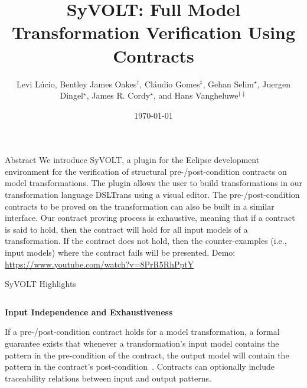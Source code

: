 \documentclass[final,hyperref={pdfpagelabels=false}]{beamer}
\title{SyVOLT: Full Model Transformation Verification Using Contracts}
\author{Levi L\'{u}cio, Bentley James Oakes$^{\dagger}$, Cl\'{a}udio Gomes$^{\ddagger}$, Gehan Selim$^{\star}$,
  Juergen Dingel$^{\star}$,
  James R. Cordy$^{\star}$, and
  Hans Vangheluwe$^{\dagger\ddagger}$
  }
\institute[McGill, Antwerp, Queen's]{$^{\dagger}$McGill University, Montreal, Canada\qquad
       $^{\ddagger}$University of Antwerp, Belgium
       $^{\star}$Queen's University, Kingston, Canada}
\date{\today}
\begin{document}
  \begin{frame}{}
      \vspace{-2.7cm}
        \begin{block}{\normalsize Abstract}
        \footnotesize
   		We introduce SyVOLT, a plugin for the Eclipse
   		development environment for the verification of structural pre-/post-condition contracts on model transformations. The plugin
   		allows the user to build transformations in our transformation
   		language DSLTrans using a visual editor. The pre-/post-condition
   		contracts to be proved on the transformation can also be built in
   		a similar interface. Our contract proving process is exhaustive,
   		meaning that if a contract is said to hold, then the contract will
   		hold for all input models of a transformation. If the contract does
   		not hold, then the counter-examples (i.e., input models) where the
   		contract fails will be presented.
   		Demo: \url{https://www.youtube.com/watch?v=8PrR5RhPptY}
        \end{block}
        
\vspace{-0.2cm}
    \begin{block}{SyVOLT Highlights}
    

    \vspace{-2.2cm}
            \begin{columns}[t,totalwidth=\linewidth]
             \begin{column}{.19\linewidth}
             \footnotesize
           \begin{center}\textbf{Input Independence and Exhaustiveness}\end{center}
           \footnotesize
           If a pre-/post-condition contract holds for a model transformation, a formal guarantee
           exists that whenever a transformation's input model contains
           the pattern in the pre-condition of the contract,
           the output model will contain the pattern
           in the contract's post-condition~\cite{Lucio2014}. Contracts can optionally include traceability relations between input and output
           patterns. \\~\\
           

\end{column}
\end{columns}
\end{block}
\end{frame}
\end{document}
